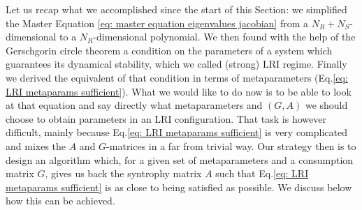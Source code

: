 \documentclass[12pt, titlepage]{report}
\begin{document}
%
Let us recap what we accomplished since the start of this Section: we simplified the Master Equation \eqref{eq: master equation eigenvalues jacobian} from a $N_R+N_S$-dimensional to a $N_R$-dimensional polynomial. We then found with the help of the Gerschgorin circle theorem a condition on the parameters of a system which guarantees its dynamical stability, which we called (strong) LRI regime. Finally we derived the equivalent of that condition in terms of metaparameters (Eq.\ref{eq: LRI metaparams sufficient}). What we would like to do now is to be able to look at that equation and say directly what metaparameters and $(G,A)$ we should choose to obtain parameters in an LRI configuration. That task is however difficult, mainly because Eq.\eqref{eq: LRI metaparams sufficient} is very complicated and mixes the $A$ and $G$-matrices in a far from trivial way. Our strategy then is to design an algorithm which, for a given set of metaparameters and a consumption matrix $G$, gives us back the syntrophy matrix $A$ such that Eq.\eqref{eq: LRI metaparams sufficient} is as close to being satisfied as possible. We discuss below how this can be achieved.
\end{document}
